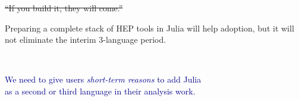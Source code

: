 \documentclass[aspectratio=169]{beamer}
\begin{document}
\begin{frame}{\sout{``If you build it, they will come.''}}

\Large
\vspace{0.6 cm}
Preparing a complete stack of HEP tools in Julia will help adoption, but it will not eliminate the interim 3-language period.

\vspace{0.95 cm}

\large
\vspace{0.95 cm}
\end{frame}

\begin{frame}{\mbox{ }}
\vspace{0.5 cm}
\LARGE
\begin{center}
\textcolor{darkblue}{We need to give users {\it short-term reasons} to add Julia \\ as a second or third language in their analysis work.}
\end{center}
\end{frame}
\end{document}
